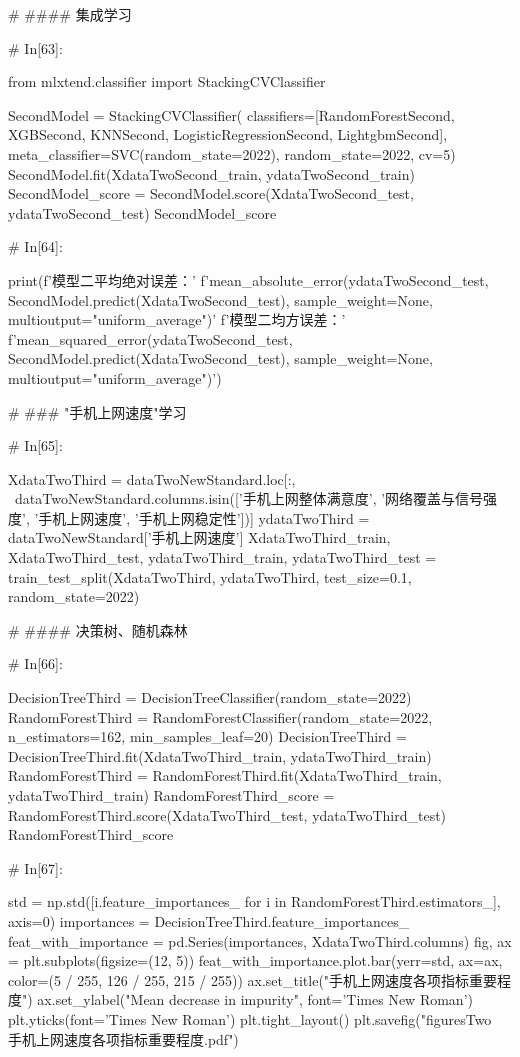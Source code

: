 \documentclass{MathorCupmodeling}
\begin{document}
\begin{python}
	# #### 集成学习
	
	# In[63]:
	
	
	from mlxtend.classifier import StackingCVClassifier
	
	SecondModel = StackingCVClassifier(
		classifiers=[RandomForestSecond, XGBSecond, KNNSecond, LogisticRegressionSecond, LightgbmSecond],
		meta_classifier=SVC(random_state=2022), random_state=2022, cv=5)
	SecondModel.fit(XdataTwoSecond_train, ydataTwoSecond_train)
	SecondModel_score = SecondModel.score(XdataTwoSecond_test, ydataTwoSecond_test)
	SecondModel_score
	
	# In[64]:
	
	
	print(f'模型二平均绝对误差：'
		  f'{mean_absolute_error(ydataTwoSecond_test, SecondModel.predict(XdataTwoSecond_test), sample_weight=None, multioutput="uniform_average")}\n'
		  f'模型二均方误差：'
		  f'{mean_squared_error(ydataTwoSecond_test, SecondModel.predict(XdataTwoSecond_test), sample_weight=None, multioutput="uniform_average")}')
	
	# ### "手机上网速度"学习
	
	# In[65]:
	
	
	XdataTwoThird = dataTwoNewStandard.loc[:, ~dataTwoNewStandard.columns.isin(['手机上网整体满意度', '网络覆盖与信号强度', '手机上网速度', '手机上网稳定性'])]
	ydataTwoThird = dataTwoNewStandard['手机上网速度']
	XdataTwoThird_train, XdataTwoThird_test, ydataTwoThird_train, ydataTwoThird_test = train_test_split(XdataTwoThird, ydataTwoThird, test_size=0.1, random_state=2022)
	
	# #### 决策树、随机森林
	
	# In[66]:
	
	
	DecisionTreeThird = DecisionTreeClassifier(random_state=2022)
	RandomForestThird = RandomForestClassifier(random_state=2022, n_estimators=162, min_samples_leaf=20)
	DecisionTreeThird = DecisionTreeThird.fit(XdataTwoThird_train, ydataTwoThird_train)
	RandomForestThird = RandomForestThird.fit(XdataTwoThird_train, ydataTwoThird_train)
	RandomForestThird_score = RandomForestThird.score(XdataTwoThird_test, ydataTwoThird_test)
	RandomForestThird_score
	
	# In[67]:
	
	
	std = np.std([i.feature_importances_ for i in RandomForestThird.estimators_], axis=0)
	importances = DecisionTreeThird.feature_importances_
	feat_with_importance = pd.Series(importances, XdataTwoThird.columns)
	fig, ax = plt.subplots(figsize=(12, 5))
	feat_with_importance.plot.bar(yerr=std, ax=ax, color=(5 / 255, 126 / 255, 215 / 255))
	ax.set_title("手机上网速度各项指标重要程度")
	ax.set_ylabel("Mean decrease in impurity", font='Times New Roman')
	plt.yticks(font='Times New Roman')
	plt.tight_layout()
	plt.savefig("figuresTwo\\[附件2]手机上网速度各项指标重要程度.pdf")
	

\end{python}
\end{document}
